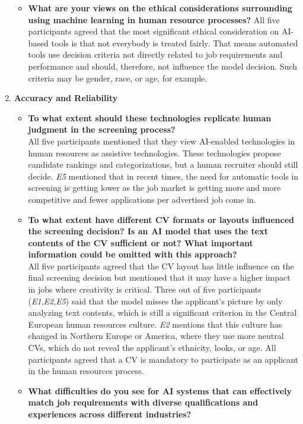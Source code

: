 \documentclass[draft,final]{thesisclass} %
\begin{document}
\begin{enumerate}
\begin{itemize}
        \item \textbf{What are your views on the ethical considerations surrounding using machine learning in human resource processes?}
        All five participants agreed that the most significant ethical consideration on \acs{AI}-based tools is that not everybody is treated fairly. That means automated tools use decision criteria not directly related to job requirements and performance and should, therefore, not influence the model decision. Such criteria may be gender, race, or age, for example.
    \end{itemize}
    \item \textbf{Accuracy and Reliability}
    \begin{itemize}
        \item \textbf{To what extent should these technologies replicate human judgment in the screening process?}\\
        All five participants mentioned that they view \acs{AI}-enabled technologies in human resources as assistive technologies.
        These technologies propose candidate rankings and categorizations, but a human recruiter should still decide. \textit{E5} mentioned that in recent times, the need for automatic tools in screening is getting lower as the job market is getting more and more competitive and fewer applications per advertised job come in.
        \item \textbf{To what extent have different \acs{CV} formats or layouts influenced the screening decision? Is an \acs{AI} model that uses the text contents of the \acs{CV} sufficient or not? What important information could be omitted with this approach?}\\
        All five participants agreed that the \acs{CV} layout has little influence on the final screening decision but mentioned that it may have a higher impact in jobs where creativity is critical. Three out of five participants (\textit{E1},\textit{E2},\textit{E5}) said that the model misses the applicant's picture by only analyzing text contents, which is still a significant criterion in the Central European human resources culture. \textit{E2} mentions that this culture has changed in Northern Europe or America, where they use more neutral \acs{CV}s, which do not reveal the applicant's ethnicity, looks, or age. All participants agreed that a \acs{CV} is mandatory to participate as an applicant in the human resources process.
        \item \textbf{What difficulties do you see for \acs{AI} systems that can effectively match job requirements with diverse qualifications and experiences across different industries?}\\

\end{itemize}
\end{enumerate}
\end{document}
